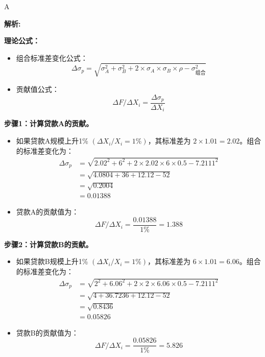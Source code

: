 \documentclass{article}
\newenvironment{explanation}
{\textbf{解析:}\par}
{\par}
\begin{document}
\begin{correctanswer}
    A
\end{correctanswer}

\begin{explanation}
    \textbf{理论公式：}
    \begin{itemize}
        \item 组合标准差变化公式：
        \[
        \Delta \sigma_p = \sqrt{\sigma_A^2 + \sigma_B^2 + 2 \times \sigma_A \times \sigma_B \times \rho - \sigma_{组合}^2}
        \]
        \item 贡献值公式：
        \[
        \Delta F / \Delta X_i = \frac{\Delta \sigma_p}{\Delta X_i}
        \]
    \end{itemize}

    \textbf{步骤1：计算贷款A的贡献。}
    \begin{itemize}
        \item 如果贷款A规模上升1\% \((\Delta X_i / X_i = 1\%)\)，其标准差为 \(2 \times 1.01 = 2.02\)。组合的标准差变化为：
        \begin{align*}
            \Delta \sigma_p &= \sqrt{2.02^2 + 6^2 + 2 \times 2.02 \times 6 \times 0.5 - 7.2111^2} \\
                            &= \sqrt{4.0804 + 36 + 12.12 - 52} \\
                            &= \sqrt{0.2004} \\
                            &= 0.01388
        \end{align*}
        \item 贷款A的贡献值为：
        \[
        \Delta F / \Delta X_i = \frac{0.01388}{1\%} = 1.388
        \]
    \end{itemize}

    \textbf{步骤2：计算贷款B的贡献。}
    \begin{itemize}
        \item 如果贷款B规模上升1\% \((\Delta X_i / X_i = 1\%)\)，其标准差为 \(6 \times 1.01 = 6.06\)。组合的标准差变化为：
        \begin{align*}
            \Delta \sigma_p &= \sqrt{2^2 + 6.06^2 + 2 \times 2 \times 6.06 \times 0.5 - 7.2111^2} \\
                            &= \sqrt{4 + 36.7236 + 12.12 - 52} \\
                            &= \sqrt{0.8436} \\
                            &= 0.05826
        \end{align*}
        \item 贷款B的贡献值为：
        \[
        \Delta F / \Delta X_i = \frac{0.05826}{1\%} = 5.826
        \]
    \end{itemize}
\end{explanation}
\end{document}
